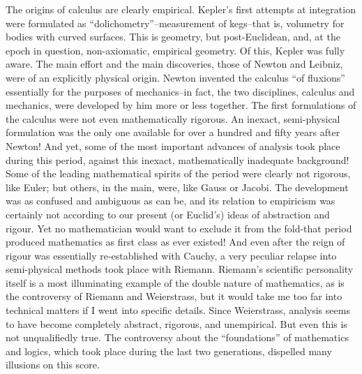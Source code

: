 \documentclass{article}
\begin{document}
The origins of calculus are clearly empirical. Kepler's first attempts at integration were formulated as ``dolichometry''--measurement of kegs--that is, volumetry for bodies with curved surfaces. This is geometry, but post-Euclidean, and, at the epoch in question, non-axiomatic, empirical geometry. Of this, Kepler was fully aware. The main effort and the main discoveries, those of Newton and Leibniz, were of an explicitly physical origin. Newton invented the calculus ``of fluxions'' essentially for the purposes of mechanics--in fact, the two disciplines, calculus and mechanics, were developed by him more or less together. The first formulations of the calculus were not even mathematically rigorous. An inexact, semi-physical formulation was the only one available for over a hundred and fifty years after Newton! And yet, some of the most important advances of analysis took place during this period, against this inexact, mathematically inadequate background! Some of the leading mathematical spirits of the period were clearly not rigorous, like Euler; but others, in the main, were, like Gauss or Jacobi. The development was as confused and ambiguous as can be, and its relation to empiricism was certainly not according to our present (or Euclid's) ideas of abstraction and rigour. Yet no mathematician would want to exclude it from the fold-that period produced mathematics as first class as ever existed! And even after the reign of rigour was essentially re-established with Cauchy, a very peculiar relapse into semi-physical methods took place with Riemann. Riemann's scientific personality itself is a most illuminating example of the double nature of mathematics, as is the controversy of Riemann and Weierstrass, but it would take me too far into technical matters if I went into specific details. Since Weierstrass, analysis seems to have become completely abstract, rigorous, and unempirical. But even this is not unqualifiedly true. The controversy about the ``foundations'' of mathematics and logics, which took place during the last two generations, dispelled many illusions on this score.
\end{document}
